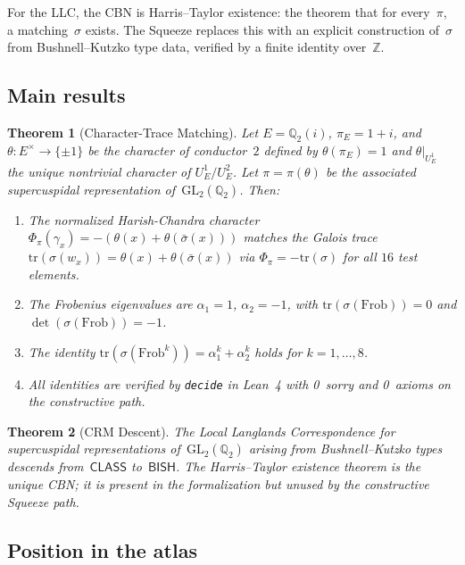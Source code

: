 \documentclass[11pt]{article}
\theoremstyle{plain}
\newtheorem{theorem}{Theorem}[section]
\theoremstyle{definition}
\theoremstyle{remark}
\newcommand{\Z}{\mathbb{Z}}
\newcommand{\Q}{\mathbb{Q}}
\newcommand{\GL}{\mathrm{GL}}
\newcommand{\Frob}{\mathrm{Frob}}
\newcommand{\tr}{\mathrm{tr}}
\newcommand{\BISH}{\mathsf{BISH}}
\newcommand{\CLASS}{\mathsf{CLASS}}
\newcommand{\Phipi}{\Phi_\pi}
\begin{document}
For the LLC, the CBN is Harris--Taylor existence: the theorem that
for every~$\pi$, a matching~$\sigma$ exists.  The Squeeze
replaces this with an explicit construction of~$\sigma$ from
Bushnell--Kutzko type data, verified by a finite identity
over~$\Z$.

\subsection{Main results}

\begin{theorem}[Character-Trace Matching]\label{thm:main}
Let $E = \Q_2(i)$, $\pi_E = 1+i$, and
$\theta : E^\times \to \{\pm 1\}$ be the character of
conductor~$2$ defined by $\theta(\pi_E) = 1$ and
$\theta|_{U_E^1}$ the unique nontrivial character of
$U_E^1/U_E^2$.  Let $\pi = \pi(\theta)$ be the associated
supercuspidal representation of~$\GL_2(\Q_2)$.  Then:
\begin{enumerate}[nosep,label=(\alph*)]
\item The normalized Harish-Chandra character $\Phipi(\gamma_x)
  = -(\theta(x) + \theta(\bar\sigma(x)))$ matches the Galois
  trace $\tr(\sigma(w_x)) = \theta(x) + \theta(\bar\sigma(x))$
  via $\Phipi = -\tr(\sigma)$ for all $16$ test elements.
\item The Frobenius eigenvalues are $\alpha_1 = 1$,
  $\alpha_2 = -1$, with $\tr(\sigma(\Frob)) = 0$ and
  $\det(\sigma(\Frob)) = -1$.
\item The identity $\tr(\sigma(\Frob^k)) = \alpha_1^k +
  \alpha_2^k$ holds for $k = 1, \ldots, 8$.
\item All identities are verified by \texttt{decide} in Lean~4
  with 0~sorry and 0~axioms on the constructive path.
\end{enumerate}
\end{theorem}

\begin{theorem}[CRM Descent]\label{thm:descent}
The Local Langlands Correspondence for supercuspidal
representations of~$\GL_2(\Q_2)$ arising from Bushnell--Kutzko
types descends from~$\CLASS$ to~$\BISH$.  The Harris--Taylor
existence theorem is the unique CBN; it is present in the
formalization but unused by the constructive Squeeze path.
\end{theorem}

\subsection{Position in the atlas}
\end{document}
